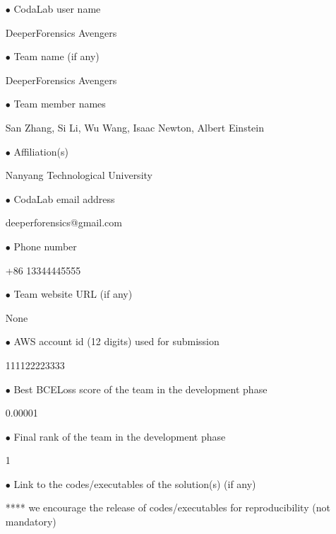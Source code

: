 \documentclass[runningheads]{llncs}
\begin{document}
\begin{spacing}{1.5}
\begin{itemize}

\item[$\bullet$] CodaLab user name

DeeperForensics Avengers

\item[$\bullet$] Team name (if any)

DeeperForensics Avengers

\item[$\bullet$] Team member names

San Zhang, Si Li, Wu Wang, Isaac Newton, Albert Einstein

\item[$\bullet$] Affiliation(s)

Nanyang Technological University

\item[$\bullet$] CodaLab email address

deeperforensics@gmail.com

\item[$\bullet$] Phone number

+86 13344445555

\item[$\bullet$] Team website URL (if any)

None

\item[$\bullet$] AWS account id (12 digits) used for submission

111122223333

\item[$\bullet$] Best BCELoss score of the team in the development phase

0.00001

\item[$\bullet$] Final rank of the team in the development phase

1

\item[$\bullet$] Link to the codes/executables of the solution(s) (if any)

**** we encourage the release of codes/executables for reproducibility (not mandatory) 

\end{itemize}
\end{spacing}
\end{document}
